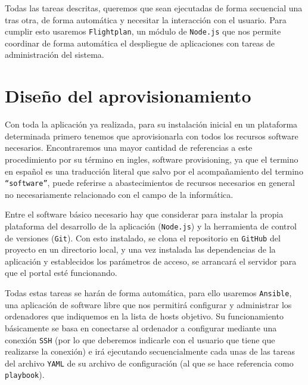 \bigskip
Todas las tareas descritas, queremos que sean ejecutadas de forma secuencial una tras otra, de forma automática y necesitar
la interacción con el usuario. Para cumplir esto usaremos {\tt Flightplan}, un módulo de {\tt Node.js} que nos permite coordinar de forma
automática el despliegue de aplicaciones con tareas de administración del sistema.

\newpage
\section{Diseño del aprovisionamiento}

Con toda la aplicación ya realizada, para su instalación inicial en un plataforma determinada primero tenemos que aprovisionarla
con todos los recursos software necesarios. Encontraremos una mayor cantidad de referencias a este procedimiento por su término
en ingles, software provisioning, ya que el termino en español es una traducción literal que salvo por el acompañamiento del 
termino {\tt ``software''}, puede referirse a abastecimientos de recursos necesarios en general no necesariamente relacionado con el
campo de la informática.

\bigskip
Entre el software básico necesario hay que considerar para instalar la propia plataforma del desarrollo de la aplicación 
({\tt Node.js}) y la herramienta de control de versiones ({\tt Git}). Con esto instalado, se clona el repositorio en {\tt GitHub} del proyecto
en un directorio local, y una vez instalada las dependencias de la aplicación y establecidos los parámetros de acceso, se
arrancará el servidor para que el portal esté funcionando.

\bigskip
Todas estas tareas se harán de forma automática, para ello usaremos {\tt Ansible}, una aplicación de software libre que nos permitirá
configurar y administrar los ordenadores que indiquemos en la lista de hosts objetivo. Su funcionamiento básicamente se basa
en conectarse al ordenador a configurar mediante una conexión {\tt SSH} (por lo que deberemos indicarle con el usuario que tiene que
realizarse la conexión) e irá ejecutando secuencialmente cada unas de las tareas del archivo {\tt YAML} de su archivo de configuración
(al que se hace referencia como {\tt playbook}).